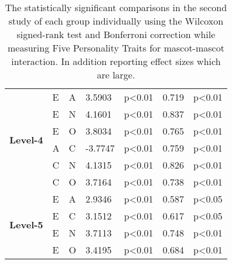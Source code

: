 \begin{table}
\begin{center}
\begin{tabular}{ |p{1.3cm}| p{0.5cm}|p{0.5cm}|p{1.2cm}| p{1.7cm}|p{1cm}|p{1.5cm}|  }
            \multirow{6}{*}{\textbf{Level-4}}
            &E &A &3.5903 &p<0.01 &0.719 &p<0.01\\
            &E &N &4.1601 &p<0.01 &0.837 &p<0.01\\
            &E &O &3.8034 &p<0.01 &0.765 &p<0.01\\
            &A &C &-3.7747 &p<0.01 &0.759 &p<0.01\\
            &C &N &4.1315 &p<0.01 &0.826 &p<0.01\\
            &C &O &3.7164 &p<0.01 &0.738 &p<0.01\\
            \hline
            \hline
            \multirow{4}{*}{\textbf{Level-5}}
            &E &A &2.9346 &p<0.01 &0.587 &p<0.05\\
            &E &C &3.1512 &p<0.01 &0.617 &p<0.05\\
            &E &N &3.7113 &p<0.01 &0.748 &p<0.01\\
            &E &O &3.4195 &p<0.01 &0.684 &p<0.01\\
            \hline
        \end{tabular}
    \end{center}
    \captionsetup{width=13.5cm}
    \caption{The statistically significant comparisons in the second study of each group individually using the
    Wilcoxon signed-rank test and Bonferroni correction while measuring Five Personality
    Traits for mascot-mascot interaction.
    In addition reporting effect sizes which are large.}
    \label{table:wilcoxMM2}
\end{table}
\pagebreak
